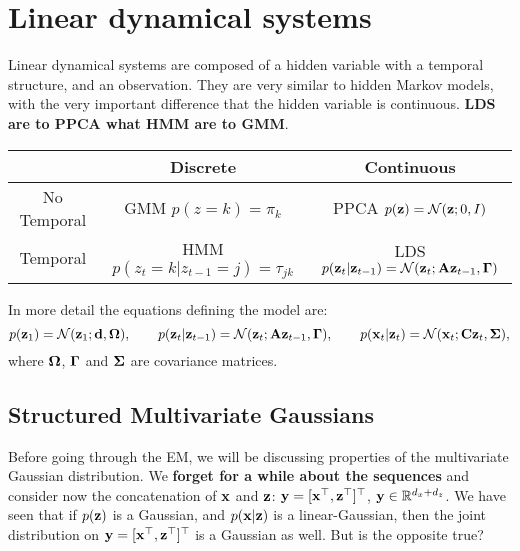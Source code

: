 

\chapter{Linear dynamical systems}
\label{ch:lds}
Linear dynamical systems are composed of a hidden variable with a temporal structure, and an observation. They are very similar to hidden Markov models, with the very important difference that the hidden variable is continuous. {\bf LDS are to PPCA what HMM are to GMM}.
\begin{center}
\begin{tabular}{c||c|c}
\toprule
  & Discrete & Continuous \\\midrule\midrule
 No Temporal & {GMM $p(z=k) = \pi_k$} & {PPCA $p(\boldsymbol{\mathbf{z}}) = {\cal N}(\boldsymbol{\mathbf{z}};0,I)$}\\\midrule
 Temporal & {HMM $p(z_t=k|z_{t-1}=j) = \tau_{jk}$} & {LDS} $p(\boldsymbol{\mathbf{z}}_t|\boldsymbol{\mathbf{z}}_{t-1}) = {\cal N}(\boldsymbol{\mathbf{z}}_t;\boldsymbol{\mathbf{A}}\boldsymbol{\mathbf{z}}_{t-1},\boldsymbol{\mathbf{\Gamma}})$\\
 \bottomrule
\end{tabular}
\end{center}\vspace{3mm}
In more detail the equations defining the model are:
\begin{equation}
 p(\boldsymbol{\mathbf{z}}_1) = {\cal N}(\boldsymbol{\mathbf{z}}_1;\boldsymbol{\mathbf{d}},\boldsymbol{\mathbf{\Omega}}), \qquad p(\boldsymbol{\mathbf{z}}_t|\boldsymbol{\mathbf{z}}_{t-1}) = {\cal N}(\boldsymbol{\mathbf{z}}_t;\boldsymbol{\mathbf{A}}\boldsymbol{\mathbf{z}}_{t-1},\boldsymbol{\mathbf{\Gamma}}), \qquad p(\boldsymbol{\mathbf{x}}_t|\boldsymbol{\mathbf{z}}_t) = {\cal N}(\boldsymbol{\mathbf{x}}_t;\boldsymbol{\mathbf{C}}\boldsymbol{\mathbf{z}}_t,\boldsymbol{\mathbf{\Sigma}}),\label{eq:lds_model}
\end{equation}
where $\boldsymbol{\mathbf{\Omega}}$, $\boldsymbol{\mathbf{\Gamma}}$ and $\boldsymbol{\mathbf{\Sigma}}$ are covariance matrices.\vspace{3mm}


\section{Structured Multivariate Gaussians}

Before going through the EM, we will be discussing properties of the multivariate Gaussian distribution. We \textbf{forget for a while about the sequences} and consider now the concatenation of $\boldsymbol{\mathbf{x}}$ and $\boldsymbol{\mathbf{z}}$: $\boldsymbol{\mathbf{y}} = [\boldsymbol{\mathbf{x}}^\top,\boldsymbol{\mathbf{z}}^\top]^\top$, $\boldsymbol{\mathbf{y}}\in\mathbb{R}^{d_x+d_z}$. We have seen that if $p(\boldsymbol{\mathbf{z}})$ is a Gaussian, and $p(\boldsymbol{\mathbf{x}}|\boldsymbol{\mathbf{z}})$ is a linear-Gaussian, then the joint distribution on $\boldsymbol{\mathbf{y}} = [\boldsymbol{\mathbf{x}}^\top,\boldsymbol{\mathbf{z}}^\top]^\top$ is a Gaussian as well. But is the opposite true? \vspace{3mm}

